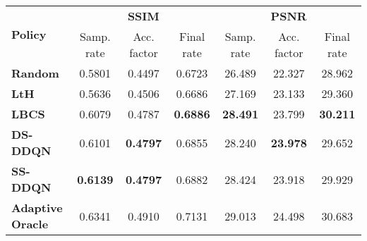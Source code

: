 
\begin{tabular}{lcccccc}
 \toprule
\multirow{2}{*}{\textbf{Policy}}& \multicolumn{3}{c}{\textbf{SSIM}}& \multicolumn{3}{c}{\textbf{PSNR}}\\
\cmidrule(l){2-4}\cmidrule(l){5-7}
& Samp. rate & Acc. factor & Final rate & Samp. rate & Acc. factor & Final rate\\
\midrule
\textbf{Random} & 0.5801&0.4497&0.6723 &  26.489 &22.327&28.962\\
\textbf{LtH} & 0.5636 &0.4506&0.6686& 27.169&23.133&29.360\\
\textbf{LBCS} & 0.6079 &0.4787&\textbf{0.6886}& \textbf{28.491}&23.799&\textbf{ 30.211}\\
\textbf{DS-DDQN} & 0.6101&\textbf{0.4797}&0.6855&28.240&\textbf{23.978}&29.652 \\
\textbf{SS-DDQN} & \textbf{0.6139}&\textbf{0.4797}& 0.6882&28.424 &23.918&29.929\\
\midrule
\textbf{Adaptive Oracle} & 0.6341 &0.4910&0.7131& 29.013&24.498&30.683\\

\bottomrule
\end{tabular}